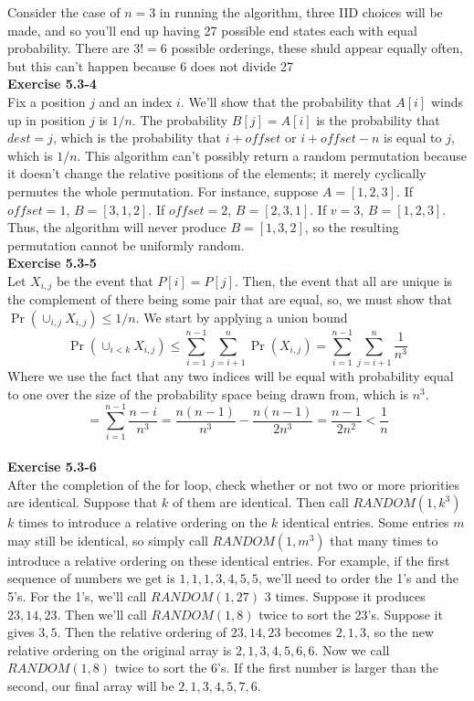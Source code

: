 \documentclass{article}
\begin{document}
Consider the case of $n=3$ in running the algorithm, three IID choices will be made, and so you'll end up having 27 possible end states each with equal probability. There are $3!=6$ possible orderings, these shuld appear equally often, but this can't happen because 6 does not divide 27\\

\noindent\textbf{Exercise 5.3-4}\\

Fix a position $j$ and an index $i$.  We'll show that the probability that $A[i]$ winds up in position $j$ is $1/n$.  The probability $B[j] = A[i]$ is the probability that $dest = j$, which is the probability that $i + o\!f\!\!f\!set$ or $i + o\!f\!\!f\!set - n$ is equal to $j$, which is $1/n$.  This algorithm can't possibly return a random permutation because it doesn't change the relative positions of the elements; it merely cyclically permutes the whole permutation.  For instance, suppose $A = [1,2,3]$.  If $o\!f\!\!f\!set = 1$, $B = [3,1,2]$.  If $o\!f\!\!f\!set = 2$, $B = [2,3,1]$.  If $v = 3$, $B = [1,2,3]$.  Thus, the algorithm will never produce $B = [1,3,2]$, so the resulting permutation cannot be uniformly random. \\

\noindent\textbf{Exercise 5.3-5}\\

Let $X_{i,j}$ be the event that $P[i] = P[j]$. Then, the event that all are unique is the complement of there being some pair that are equal, so, we must show that $\Pr(\cup_{i,j} X_{i,j}) \le 1/n$. We start by applying a union bound
\[
\Pr(\cup_{i<k} X_{i,j}) \le \sum_{i=1}^{n-1} \sum_{j=i+1}^n \Pr(X_{i,j}) = \sum_{i=1}^{n-1} \sum_{j=i+1}^n \frac{1}{n^3}
\]
Where we use the fact that any two indices will be equal with probability equal to one over the size of the probability space being drawn from, which is $n^3$.
\[
 = \sum_{i=1}^{n-1} \frac{n-i}{n^3} = \frac{n(n-1)}{n^3} - \frac{n(n-1)}{2n^3} = \frac{n-1}{2n^2} < \frac{1}{n}
\]\\

\noindent\textbf{Exercise 5.3-6}\\

After the completion of the for loop, check whether or not two or more priorities are identical.  Suppose that $k$ of them are identical.  Then call $RANDOM(1,k^3)$ $k$ times to introduce a relative ordering on the $k$ identical entries.  Some entries $m$ may still be identical, so simply call $RANDOM(1,m^3)$ that many times to introduce a relative ordering on these identical entries.  For example, if the first sequence of numbers we get is $1, 1, 1, 3, 4, 5, 5$, we'll need to order the 1's and the 5's.  For the 1's, we'll call $RANDOM(1,27)$ 3 times.  Suppose it produces $23, 14, 23$.  Then we'll call $RANDOM(1,8)$ twice to sort the 23's.  Suppose it gives $3, 5$. Then the relative ordering of $23, 14, 23$ becomes $2, 1, 3$, so the new relative ordering on the original array is $2, 1, 3, 4, 5, 6, 6$.  Now we call $RANDOM(1,8)$ twice to sort the 6's.  If the first number is larger than the second, our final array will be $2, 1, 3, 4, 5, 7, 6$. \\
\end{document}
